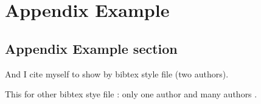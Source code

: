 \chapter{Appendix Example}
\label{chap:appendix1}

\section{Appendix Example section}

And I cite myself to show by bibtex style file (two authors).

This for other bibtex stye file : only one author \cite{diloreto} and many authors \cite{diloreto}.